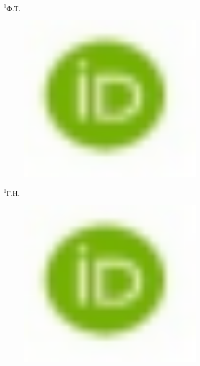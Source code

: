 {\textsuperscript{1}Ф.Т.
\begin{figure}[H]
	\centering
	\includegraphics[width=0.8\textwidth]{media/pish2/image2}
	\caption*{}
\end{figure}

\textsuperscript{1}Г.Н.
\begin{figure}[H]
	\centering
	\includegraphics[width=0.8\textwidth]{media/pish2/image2}
	\caption*{}
\end{figure}

}
